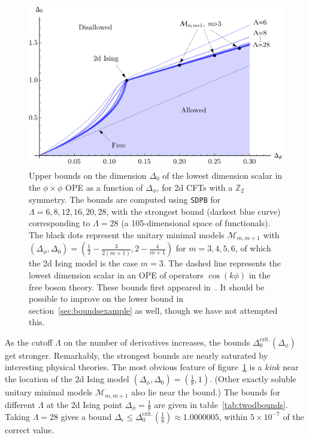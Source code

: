 \documentclass[11pt]{ws-rv9x6}
\newcommand\f\phi
\newcommand\e\epsilon
\newcommand\<\langle
\renewcommand\>\rangle
\newcommand\Z{\mathbb{Z}}
\renewcommand\.{\cdot}
\newcommand\x\times
\newcommand\De{\Delta}
\begin{document}
\begin{figure}[hpt!]
\begin{center}
\includegraphics[width=\textwidth]{2dBound}
\end{center}
\caption{\label{fig:2dbound}
Upper bounds on the dimension $\De_0$ of the lowest dimension scalar in the $\f\x\f$ OPE as a function of $\De_\f$, for 2d CFTs with a $\Z_2$ symmetry. The bounds are computed using {\tt SDPB} for $\Lambda=6,8,12,16,20,28$, with the strongest bound (darkest blue curve) corresponding to $\Lambda=28$ (a 105-dimensional space of functionals). The black dots represent the unitary minimal models $\mathcal{M}_{m,m+1}$ with $(\De_\f,\De_0)=(\frac 1 2 - \frac{3}{2(m+1)},2-\frac{4}{m+1})$ for $m=3,4,5,6$, of which the 2d Ising model is the case $m=3$.  The dashed line represents the lowest dimension scalar in an OPE of operators $\cos(k\phi)$ in the free boson theory.  These bounds first appeared in~\cite{Rychkov:2009ij}. It should be possible to improve on the lower bound in section~\ref{sec:boundsexample} as well, though we have not attempted this.
}
\end{figure}

As the cutoff $\Lambda$ on the number of derivatives increases, the bounds $\De_0^\mathrm{crit.}(\De_\f)$ get stronger. Remarkably, the strongest bounds are nearly saturated by interesting physical theories. The most obvious feature of figure~\ref{fig:2dbound} is a {\it kink\/} near the location of the 2d Ising model $(\De_\f,\De_0)=(\frac 1 8,1)$.  (Other exactly soluble unitary minimal models $\mathcal{M}_{m,m+1}$ also lie near the bound.) The bounds for different $\Lambda$ at the 2d Ising point $\De_\f=\frac 1 8$ are given in table~\ref{tab:twodbounds}.  Taking $\Lambda=28$ gives a bound $\De_\e \leq \De_0^\mathrm{crit.}(\frac 1 8)\approx 1.0000005$, within $5\x 10^{-7}$ of the correct value.
\end{document}
